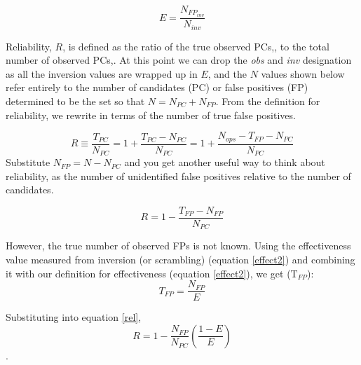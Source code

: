 \begin{equation}
\label{effect2}
E = \frac{N_{FP_{inv}}}{N_{inv}}
\end{equation}

Reliability, $R$, is defined as the ratio of the true observed PCs,\trueopspc, to the total number of observed PCs,\opspc. At this point we can drop the \textit{obs} and \textit{inv} designation as all the inversion values are wrapped up in $E$, and the $N$ values shown below refer entirely to the number of candidates (PC) or false positives (FP) determined to be the \opstce set so that $N=N_{PC} + N_{FP}$. From the definition for reliability, we rewrite in terms of the number of true false positives.

\begin{equation}
R \equiv \frac{T_{PC}}{N_{PC}} =  1 + \frac{T_{PC}-N_{PC}}{N_{PC}} 
= 1 + \frac{N_{ops} - T_{FP} - N_{PC}}{N_{PC}}
\end{equation}
Substitute $N_{FP}=N-N_{PC}$ and you get another useful way to think about reliability, as the number of unidentified false positives relative to the number of candidates.

\begin{equation}
\label{rel}
R = 1 - \frac{T_{FP}-N_{FP}}{N_{PC}}
\end{equation}

However, the true number of observed FPs is not known. Using the effectiveness value measured from inversion (or scrambling) (equation \ref{effect2}) and combining it with our definition for effectiveness (equation \ref{effect2}), we get (T$_{FP}$):
\begin{equation}
T_{FP} = \frac{N_{FP}}{E} 
\end{equation}

Substituting into equation \ref{rel},
\textbf{
\begin{equation}
R= 1 - \frac{N_{FP}}{N_{PC}}(\frac{1-E}{E})
\end{equation}
}.




